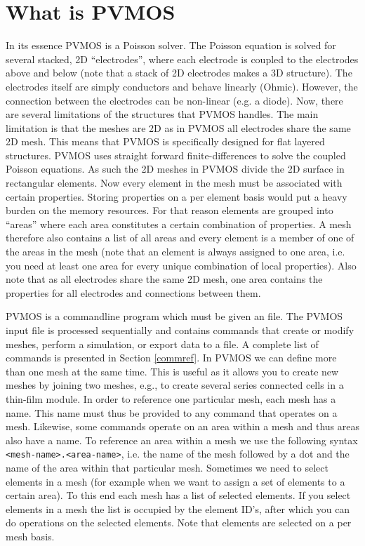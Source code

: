 \documentclass[noshowpacs,preprintnumbers,amsmath,amssymb, letter]{revtex4}
\begin{document}
\section{What is PVMOS}
In its essence PVMOS is a Poisson solver. The Poisson equation is solved for several stacked, 2D ``electrodes'', where each electrode is coupled to the electrodes above and below (note that a stack of 2D electrodes makes a 3D structure). The electrodes itself are simply conductors and behave linearly (Ohmic). However, the connection between the electrodes can be non-linear (e.g. a diode). Now, there are several limitations of the structures that PVMOS handles. The main limitation is that the meshes are 2D as in PVMOS all electrodes share the same 2D mesh. This means that PVMOS is specifically designed for flat layered structures. PVMOS uses straight forward finite-differences to solve the coupled Poisson equations. As such the 2D meshes in PVMOS divide the 2D surface in rectangular elements. Now every element in the mesh must be associated with certain properties. Storing properties on a per element basis would put a heavy burden on the memory resources. For that reason elements are grouped into ``areas'' where each area constitutes a certain combination of properties. A mesh therefore also contains a list of all areas and every element is a member of one of the areas in the mesh (note that an element is always assigned to one area, i.e. you need at least one area for every unique combination of local properties). Also note that as all electrodes share the same 2D mesh, one area contains the properties for all electrodes and connections between them.

PVMOS is a commandline program which must be given an file. The PVMOS input file is processed sequentially and contains commands that create or modify meshes, perform a simulation, or export data to a file. A complete list of commands is presented in Section \ref{commref}. In PVMOS we can define more than one mesh at the same time. This is useful as it allows you to create new meshes by joining two meshes, e.g., to create several series connected cells in a thin-film module. In order to reference one particular mesh, each mesh has a name. This name must thus be provided to any command that operates on a mesh. Likewise, some commands operate on an area within a mesh and thus areas also have a name. To reference an area within a mesh we use the following syntax \texttt{<mesh-name>.<area-name>}, i.e. the name of the mesh followed by a dot and the name of the area within that particular mesh. Sometimes we need to select elements in a mesh (for example when we want to assign a set of elements to a certain area). To this end each mesh has a list of selected elements. If you select elements in a mesh the list is occupied by the element ID's, after which you can do operations on the selected elements. Note that elements are selected on a per mesh basis.
\end{document}
